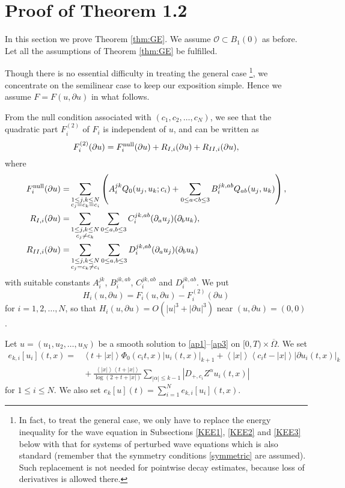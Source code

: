 \documentclass[12pt]{amsart}
\newcommand{\pa}{\partial}
\newcommand{\jb}[1]{\left\langle #1 \right\rangle}
\numberwithin{equation}{section}
\begin{document}
\section{Proof of Theorem 1.2}

In this section we prove Theorem \ref{thm:GE}.
We assume ${\mathcal O}\subset B_{1}(0)$ as before.
Let all the assumptions of Theorem \ref{thm:GE} be fulfilled.

Though there is no essential difficulty in treating the general case
\footnote{
In fact, to treat the general case, we only have to replace the energy inequality 
for the wave equation in Subsections \ref{KEE1}, \ref{KEE2} and \ref{KEE3} 
below with
that for systems of perturbed wave equations
which is also standard (remember that the symmetry conditions \eqref{symmetric}
are assumed).
Such replacement is not needed for pointwise decay estimates,
because loss of derivatives is allowed there.
},
we concentrate on the semilinear case to keep our exposition simple.
Hence we assume $F=F(u, \pa u)$ in what follows.

From the null condition associated with $(c_1, c_2, \ldots, c_N)$,  
we see that
the quadratic part $F_i^{(2)}$ of $F_i$ is independent of $u$, and
can be written as
\begin{equation}
F_i^{(2)}(\pa u)=F_i^{{\rm null}}(\pa u)+R_{I,i}(\pa u)+R_{II,i}(\pa u),
\end{equation}
where
\begin{align*}
F_i^{{\rm null}}(\pa u)=& \sum_{\substack{1\le j,k\le N\\ c_j=c_k=c_i}}
\left(A_{i}^{jk} Q_0(u_j, u_k; c_i)+\sum_{0\le a<b\le 3} B_i^{jk,ab}Q_{ab}(u_j, u_k)
\right),\\
R_{I,i}(\pa u)=&\sum_{\substack{1\le j,k\le N\\ c_j\ne c_k}}\sum_{0\le a, b\le 3}
C_i^{jk,ab} (\pa_a u_j)(\pa_b u_k),\\
R_{II,i}(\pa u)=&\sum_{\substack{1\le j,k\le N\\ c_j=c_k\ne c_i}}\sum_{0\le a, b\le 3}
D_i^{jk,ab} (\pa_a u_j)(\pa_b u_k)
\end{align*}
with suitable constants $A_i^{jk}$, $B_i^{jk, ab}$, $C_i^{jk, ab}$ and $D_i^{jk, ab}$.
We put $$
H_i(u, \pa u)=F_i(u, \pa u)-F_i^{(2)}(\pa u)
$$ for $i=1, 2, \dots, N$, so that $H_i(u,\pa u)=O(|u|^3+|\pa u|^3)$
near $(u, \pa u)=(0,0)$.

Let $u=(u_1, u_2, \dots, u_N)$ be a smooth solution to \eqref{ap1}--\eqref{ap3} on $[0,T)\times \overline{\Omega}$.
We set
\begin{align*}
e_{k,i}[u_i](t,x)=& \jb{t+|x|}\Phi_0(c_it, x)|u_i(t,x)|_{k+1}
{}+\jb{|x|}\jb{c_it-|x|}|\pa u_i(t,x)|_{k}\\
& {}+\frac{\jb{|x|}\jb{t+|x|}}{\log(2+t+|x|)}
\sum_{|\alpha|\le k-1} |D_{+, c_i}Z^\alpha u_i(t,x)|
\end{align*}
for $1\le i \le N$. We also set $e_k[u](t)=\sum_{i=1}^N e_{k,i}[u_i](t,x)$.
\end{document}
